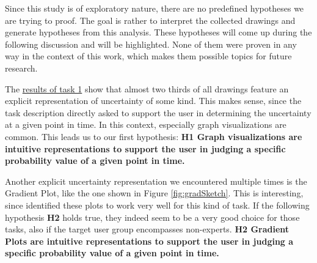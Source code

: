 Since this study is of exploratory nature, there are no predefined hypotheses we are trying to proof. The goal is rather to interpret the collected drawings and generate hypotheses from this analysis. These hypotheses will come up during the following discussion and will be highlighted. None of them were proven in any way in the context of this work, which makes them possible topics for future research. \par \medskip

The \hyperref[tb:t1]{results of task 1} show that almost two thirds of all drawings feature an explicit representation of uncertainty of some kind. This makes sense, since the task description directly asked to support the user in determining the uncertainty at a given point in time. In this context, especially graph visualizations are common. This leads us to our first hypothesis: \textbf{H1 Graph visualizations are intuitive representations to support the user in judging a specific probability value of a given point in time.} \par \medskip

Another explicit uncertainty representation we encountered multiple times is the Gradient Plot, like the one shown in Figure \ref{fig:gradSketch}. This is interesting, since \citet{gschwandtner2016visual} identified these plots to work very well for this kind of task. If the following hypothesis \textbf{H2} holds true, they indeed seem to be a very good choice for those tasks, also if the target user group encompasses non-experts. \textbf{H2 Gradient Plots are intuitive representations to support the user in judging a specific probability value of a given point in time.}\par \medskip

